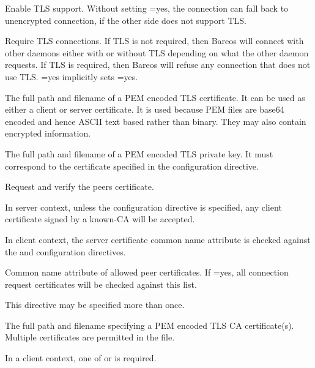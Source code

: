 \begin{description}
%
Enable TLS support. Without setting =yes,
the connection can fall back to unencrypted connection,
if the other side does not support TLS.

%
Require TLS connections.
If TLS is not required,
then Bareos will connect with other daemons either with or without TLS depending
on what the other daemon requests.
If TLS is required,
then Bareos will refuse any connection that does not use TLS.
=yes  implicitly sets =yes.

%
The full path and filename of a PEM encoded TLS certificate.  It can be
used as either a client or server certificate.
It is used because PEM files are base64 encoded and hence ASCII
text based rather than binary.
They may also contain encrypted information.

%
The full path and filename of a PEM encoded TLS private key.  It must
correspond to the certificate specified in the  configuration directive.

%
Request and verify the peers certificate.

In server context, unless the  configuration directive is specified,
any client certificate signed by a known-CA will be accepted.

In client context, the server certificate common name attribute is checked against
the  and  configuration directives.


%
Common name attribute of allowed peer certificates.
If =yes, all connection request certificates
will be checked against this list.

This directive may be specified more than once.


%
The full path and filename specifying a
PEM encoded TLS CA certificate(s).  Multiple certificates are
permitted in the file.

In a client context, one of
 or 
is required.


\end{description}
